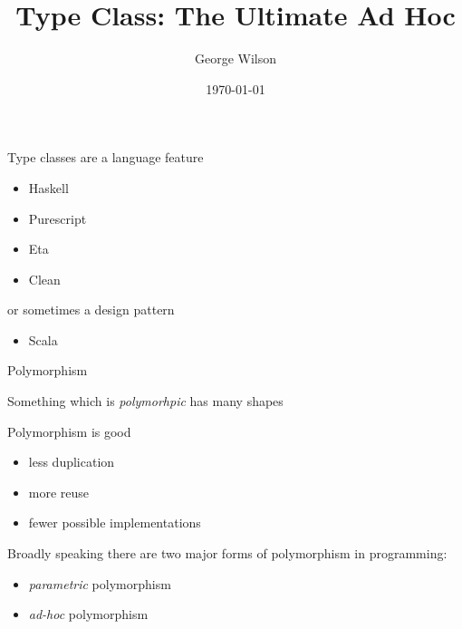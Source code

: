 \documentclass[usenames,dvipsnames,svgnames,table,aspectratio=169,mathserif]{beamer}
\title[Type Class: The Ultimate Ad Hoc]{Type Class: The Ultimate Ad Hoc} %
\author{George Wilson} %
\institute[] %
{
Data61/CSIRO\\ %
\medskip
\href{george.wilson@data61.csiro.au}{george.wilson@data61.csiro.au} %
}
\date{\today} %
\begin{document}


\begin{frame}
\titlepage %
\end{frame}


\begin{frame}

Type classes are a language feature

\begin{itemize}
\item Haskell
\item Purescript
\item Eta
\item Clean
\end{itemize}

or sometimes a design pattern

\begin{itemize}
\item Scala
\end{itemize}

\end{frame}



\begin{frame}
\begin{center}
\huge{Polymorphism}
\end{center}
\end{frame}


\begin{frame}

Something which is {\it polymorhpic} has many shapes

\end{frame}


\begin{frame}
\begin{center}
Polymorphism is good


\begin{itemize}
\item less duplication
\item more reuse
\item fewer possible implementations
\end{itemize}
\end{center}
\end{frame}


\begin{frame}
Broadly speaking there are two major forms of polymorphism in programming:

\begin{itemize}
\item {\it parametric} polymorphism
\item {\it ad-hoc} polymorphism
\end{itemize}
\end{frame}
\end{document}
